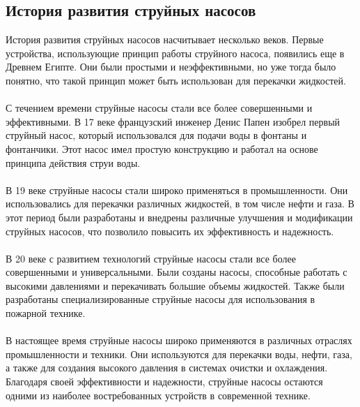 \documentclass{article}
\begin{document}
\subsection{История развития струйных насосов}
История развития струйных насосов насчитывает несколько веков. Первые устройства, использующие принцип работы струйного насоса, появились еще в Древнем Египте. Они были простыми и неэффективными, но уже тогда было понятно, что такой принцип может быть использован для перекачки жидкостей.\\
~\\
С течением времени струйные насосы стали все более совершенными и эффективными. В 17 веке французский инженер Денис Папен изобрел первый струйный насос, который использовался для подачи воды в фонтаны и фонтанчики. Этот насос имел простую конструкцию и работал на основе принципа действия струи воды.\\
~\\
В 19 веке струйные насосы стали широко применяться в промышленности. Они использовались для перекачки различных жидкостей, в том числе нефти и газа. В этот период были разработаны и внедрены различные улучшения и модификации струйных насосов, что позволило повысить их эффективность и надежность.\\
~\\
В 20 веке с развитием технологий струйные насосы стали все более совершенными и универсальными. Были созданы насосы, способные работать с высокими давлениями и перекачивать большие объемы жидкостей. Также были разработаны специализированные струйные насосы для использования в пожарной технике.\\
~\\
В настоящее время струйные насосы широко применяются в различных отраслях промышленности и техники. Они используются для перекачки воды, нефти, газа, а также для создания высокого давления в системах очистки и охлаждения. Благодаря своей эффективности и надежности, струйные насосы остаются одними из наиболее востребованных устройств в современной технике.
\end{document}
